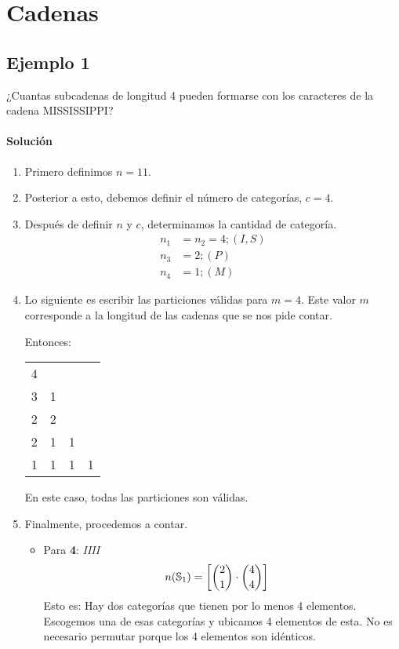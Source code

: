 \section*{Cadenas}

\subsection*{Ejemplo 1}

¿Cuantas subcadenas de longitud 4 pueden formarse con los caracteres de la cadena MISSISSIPPI?

\paragraph{Solución}

\begin{enumerate}
\item Primero definimos $n=11$. 

\item Posterior a esto, debemos definir el número de categorías, $c=4$.

\item Después de definir $n$ y $c$, determinamos la cantidad de categoría.
\begin{align*}
n_1&=n_2=4; (I, S)\\
n_3&=2; (P)\\
n_4&=1; (M)
\end{align*}

\item Lo siguiente es escribir las particiones válidas para $m=4$. Este valor $m$ corresponde a la longitud de las cadenas que se nos pide contar.

Entonces:
\begin{table}[ht!]	\centering
	\begin{tabular}{c c c c}
		4 & \\
		3 & 1 \\
		2 & 2 \\
		2 & 1 & 1 \\
		1 & 1 & 1 & 1
	\end{tabular}
\end{table}
En este caso, todas las particiones son válidas.
\item Finalmente, procedemos a contar.
\begin{itemize}

\item Para \textbf{4}:
\textit{IIII}
\begin{align*}
n(\mathbb{S}_1)&=\left[\binom{2}{1}\cdot\binom{4}{4}\right]
\end{align*}
Esto es: Hay dos categorías que tienen por lo menos 4 elementos. Escogemos una de esas categorías y ubicamos 4 elementos de esta. No es necesario permutar porque los 4 elementos son idénticos.


\end{itemize}
\end{enumerate}
